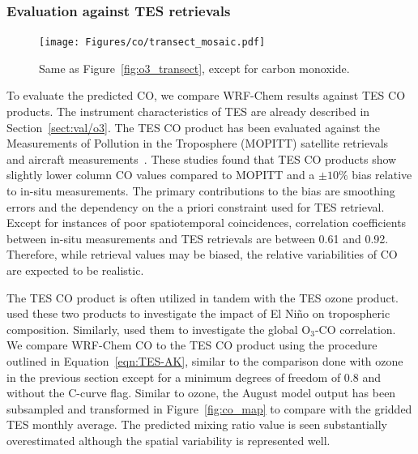 \subsubsection{Evaluation against TES retrievals}

 \begin{figure}
 \texttt{[image: Figures/co/transect\_mosaic.pdf]}
 \caption[Transect-by-transect comparison against TES CO]{Same as Figure~\ref{fig:o3_transect}, except for carbon monoxide.}
 \label{fig:co_transect}
 \end{figure}

To evaluate the predicted CO, we compare WRF-Chem results
against TES CO products. The instrument characteristics of TES are already described
in Section~\ref{sect:val/o3}. The TES CO product has been evaluated against the
Measurements of Pollution in the Troposphere (MOPITT) satellite
retrievals~\citep{Luo:2007ly,Ho:2009lh} and aircraft
measurements~\citep{Luo:2007vn,Lopez:2008ys}. These studies found that TES CO products
show slightly lower column CO values compared to MOPITT and a $\pm10\%$ bias
relative to in-situ measurements. The primary contributions to the bias are smoothing errors
and the dependency on the a priori constraint used for TES retrieval. Except for instances
of poor spatiotemporal coincidences, correlation coefficients between in-situ measurements
and TES retrievals are between 0.61 and 0.92. Therefore, while retrieval values may
be biased, the relative variabilities of CO are expected to be realistic.

The TES CO product is often utilized in tandem with the TES ozone product.
\citet{Logan:2008uq} used these two products to investigate the impact of El Ni\~no
on tropospheric composition. Similarly, \citet{Voulgarakis:2011fk} used them to
investigate the global O$_3$-CO correlation. We compare WRF-Chem CO
to the TES CO product using the procedure outlined in Equation~\ref{eqn:TES-AK},
similar to the comparison done with ozone in the  previous section except for a
minimum degrees of freedom of 0.8 and without the C-curve flag.
Similar to ozone, the August model output has been subsampled and transformed
in Figure~\ref{fig:co_map} to compare with the gridded TES monthly average. The predicted mixing
ratio value is seen substantially overestimated although the spatial variability is represented well.


